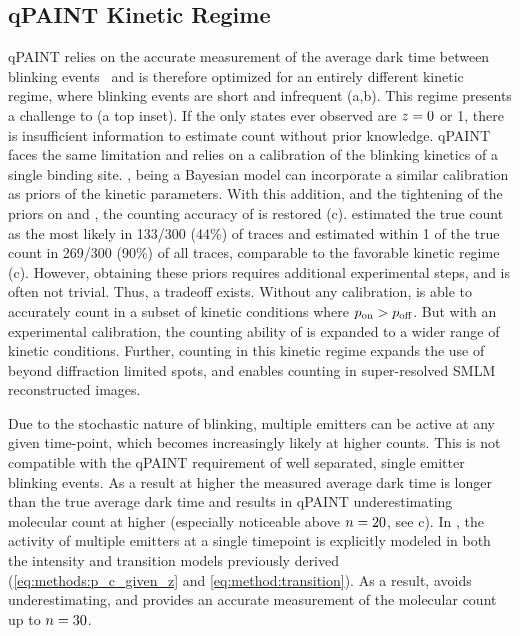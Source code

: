 \subsection{qPAINT Kinetic Regime} \label{results:qpaint}
qPAINT relies on the accurate measurement of the average dark time between blinking events~\citep{jungmann_2016} 
	and is therefore optimized for an entirely different kinetic regime, where blinking 
	events are short and infrequent (a,b).
	This regime presents a challenge to \ours (a top inset). 
	If the only states ever observed are $z_{}=0$ or 1, there is insufficient 
	information to estimate count without prior knowledge.
	qPAINT faces the same limitation and relies on a calibration 
	of the blinking kinetics of a single binding site.
	\ours, being a Bayesian model can incorporate a similar calibration 
	as priors of the kinetic parameters.
	With this addition, and the tightening of the priors on \re and \rb, the counting 
	accuracy of \ours is restored (c). 
	\ours estimated the true count as the most likely in 133/300 (44\%) of traces and 
	estimated within 1 of the true count in 269/300 (90\%) of all traces,
	comparable to the favorable kinetic regime (c).
	However, obtaining these priors requires additional experimental steps, and is often not trivial. 
	Thus, a tradeoff exists.
	Without any calibration, \ours is able to accurately count in a subset of kinetic 
	conditions where $p_\text{on} > p_\text{off}$.
	But with an experimental calibration, the counting ability of \ours is expanded 
	to a wider range of kinetic conditions. 
	Further, counting in this kinetic regime expands the use of \ours beyond diffraction limited spots, 
	and enables counting in super-resolved SMLM reconstructed images.

Due to the stochastic nature of blinking, multiple emitters can 
be active at any given time-point, which becomes increasingly likely at higher counts.
	This is not compatible with the qPAINT requirement of well separated, 
	single emitter blinking events.
	As a result at higher \n the measured average dark time is longer than the true average dark time
	and  results in qPAINT underestimating molecular count at higher \n
	(especially noticeable above $n=20$, see c). 
	In \ours, the activity of multiple emitters at a single timepoint is explicitly modeled in both the 
	intensity and transition models previously derived (\eqref{eq:methods:p_c_given_z} and \eqref{eq:method:transition}). 
	As a result, \ours avoids underestimating, and provides an accurate measurement 
	of the molecular count up to $n=30$.
	
